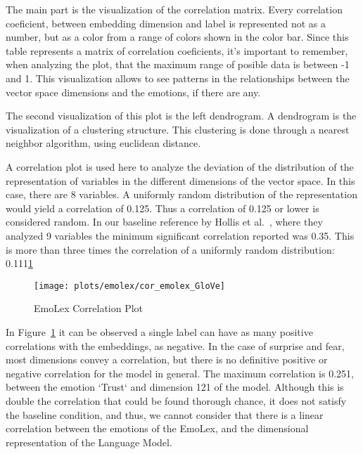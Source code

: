 The main part is the visualization of the correlation matrix. Every correlation coeficient, between embedding dimension and label is represented not as a number, but as a color from a range of colors shown in the color bar. Since this table represents a matrix of correlation coeficients, it's important to remember, when analyzing the plot, that the maximum range of posible data is between -1 and 1. This visualization allows to see patterns in the relationships between the vector space dimensions and the emotions, if there are any.

The second visualization of this plot is the left dendrogram. A dendrogram is the visualization of a clustering structure. This clustering is done through a nearest neighbor algorithm, using euclidean distance.

A correlation plot is used here to analyze the deviation of the distribution of the representation of variables in the different dimensions of the vector space. In this case, there are 8 variables. A uniformly random distribution of the representation would yield a correlation of 0.125. Thus a correlation of  0.125 or lower is considered random. In our baseline reference by Hollis et al.~\cite{hollis2016principals}, where they analyzed 9 variables the minimum significant correlation reported was 0.35. This is more than three times the correlation of a uniformly random distribution: 0.111\underline{1}

\begin{figure}[H]
  \texttt{[image: plots/emolex/cor\_emolex\_GloVe]}
  \centering
  \caption{EmoLex Correlation Plot}\label{fig:cor_emolex_GloVe}
\end{figure}

In Figure~\ref{fig:cor_emolex_GloVe} it can be observed a single label can have as many positive correlations with the embeddings, as negative. In the case of surprise and fear, most dimensions convey a correlation, but there is no definitive positive or negative correlation for the model in general.
The maximum correlation is 0.251, between the emotion `Trust` and dimension 121 of the model. Although this is double the correlation that could be found thorough chance, it does not satisfy the baseline %
condition, and thus, we cannot consider that there is a linear correlation between the emotions of the EmoLex, and the dimensional representation of the Language Model.


